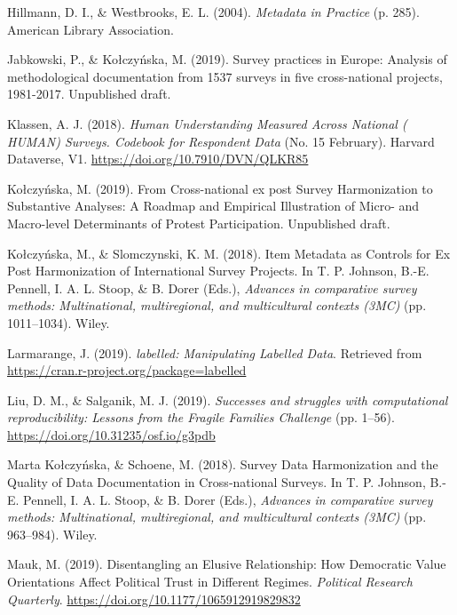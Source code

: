 \documentclass[12pt,]{article}
\begin{document}
\leavevmode\hypertarget{ref-Hillmann2004}{}%
Hillmann, D. I., \& Westbrooks, E. L. (2004). \emph{Metadata in Practice} (p. 285). American Library Association.

\leavevmode\hypertarget{ref-Jabkowski2019}{}%
Jabkowski, P., \& Kołczyńska, M. (2019). Survey practices in Europe: Analysis of methodological documentation from 1537 surveys in five cross-national projects, 1981-2017. Unpublished draft.

\leavevmode\hypertarget{ref-Klassen2018}{}%
Klassen, A. J. (2018). \emph{Human Understanding Measured Across National ( HUMAN) Surveys. Codebook for Respondent Data} (No. 15 February). Harvard Dataverse, V1. \url{https://doi.org/10.7910/DVN/QLKR85}

\leavevmode\hypertarget{ref-Kolczynska2019}{}%
Kołczyńska, M. (2019). From Cross-national ex post Survey Harmonization to Substantive Analyses: A Roadmap and Empirical Illustration of Micro- and Macro-level Determinants of Protest Participation. Unpublished draft.

\leavevmode\hypertarget{ref-KolczynskaSlomczynski2018}{}%
Kołczyńska, M., \& Slomczynski, K. M. (2018). Item Metadata as Controls for Ex Post Harmonization of International Survey Projects. In T. P. Johnson, B.-E. Pennell, I. A. L. Stoop, \& B. Dorer (Eds.), \emph{Advances in comparative survey methods: Multinational, multiregional, and multicultural contexts (3MC)} (pp. 1011--1034). Wiley.

\leavevmode\hypertarget{ref-labelled}{}%
Larmarange, J. (2019). \emph{labelled: Manipulating Labelled Data}. Retrieved from \url{https://cran.r-project.org/package=labelled}

\leavevmode\hypertarget{ref-Liu2019}{}%
Liu, D. M., \& Salganik, M. J. (2019). \emph{Successes and struggles with computational reproducibility: Lessons from the Fragile Families Challenge} (pp. 1--56). \url{https://doi.org/10.31235/osf.io/g3pdb}

\leavevmode\hypertarget{ref-KolczynskaSchoene2018}{}%
Marta Kołczyńska, \& Schoene, M. (2018). Survey Data Harmonization and the Quality of Data Documentation in Cross‐national Surveys. In T. P. Johnson, B.-E. Pennell, I. A. L. Stoop, \& B. Dorer (Eds.), \emph{Advances in comparative survey methods: Multinational, multiregional, and multicultural contexts (3MC)} (pp. 963--984). Wiley.

\leavevmode\hypertarget{ref-Mauk2019}{}%
Mauk, M. (2019). Disentangling an Elusive Relationship: How Democratic Value Orientations Affect Political Trust in Different Regimes. \emph{Political Research Quarterly}. \url{https://doi.org/10.1177/1065912919829832}
\end{document}
